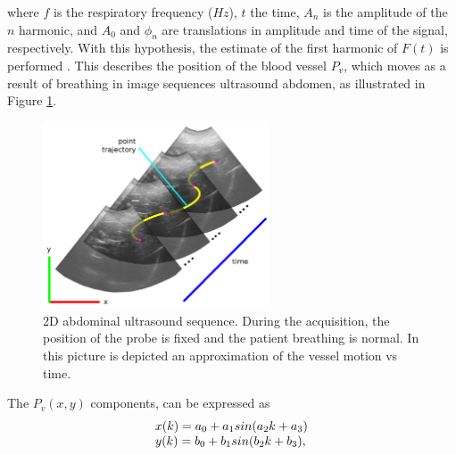 \documentclass[10pt,a4paper,report]{article}
\begin{document}
where $f$ is the respiratory frequency ($Hz$), $t$ the time, $A_n$ is the amplitude of the $n$ harmonic, and $A_0$ and $\phi_n$ are translations in amplitude and time of the signal, respectively.
With this hypothesis, the estimate of the first harmonic of $ F ( t) $ is performed . This describes the position of the blood vessel $P_v $, which moves as a result of breathing in image sequences ultrasound abdomen, as illustrated in Figure \ref{fig:pointTrajectory}.
%
\begin{figure}[h!]
\centering
\includegraphics[width=0.6\textwidth]{figures/pointTrajectory}
\caption{2D abdominal ultrasound sequence. During the acquisition,  the position of the probe is fixed and the patient breathing is normal. In this picture is depicted an approximation of the vessel motion vs time.}
\label{fig:pointTrajectory}
\end{figure}
%
The $P_v(x,y)$ components, can be expressed as
\begin{equation}
\begin{tabular}{l}
$x(k) = a_0 + a_1 sin (a_2 k + a_3)$\\
$y(k) = b_0 + b_1 sin (b_2 k + b_3)$,
\end{tabular}
\label{eq:coord}
\end{equation}
\end{document}
